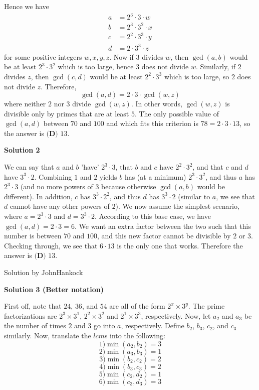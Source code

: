 \begin{enumerate}
 Hence we have
 \begin{align*} a &= 2^3\cdot 3\cdot w\\ b &= 2^3\cdot 3^2\cdot x\\ c &= 2^2\cdot 3^3\cdot y\\ d &= 2\cdot 3^3\cdot z \end{align*}
for some positive integers $w,x,y,z$. Now if $3$ divides $w$, then $\gcd(a,b)$ would be at least $2^3\cdot 3^2$ which is too large, hence $3$ does not divide $w$. Similarly, if $2$ divides $z$, then $\gcd(c,d)$ would be at least $2^2\cdot 3^3$ which is too large, so $2$ does not divide $z$. Therefore,
 \[\gcd(a,d)=2\cdot 3\cdot \gcd(w,z)\]where neither $2$ nor $3$ divide $\gcd(w,z)$. In other words, $\gcd(w,z)$ is divisible only by primes that are at least $5$. The only possible value of $\gcd(a,d)$ between $70$ and $100$ and which fits this criterion is $78=2\cdot3\cdot13$, so the answer is $\boxed{\textbf{(D) }13}$.

 



\textbf{Solution 2}

We can say that $a$ and $b$ 'have' $2^3 \cdot 3$, that $b$ and $c$ have $2^2 \cdot 3^2$, and that $c$ and $d$ have $3^3 \cdot 2$. Combining $1$ and $2$ yields $b$ has (at a minimum) $2^3 \cdot 3^2$, and thus $a$ has $2^3 \cdot 3$ (and no more powers of $3$ because otherwise $\gcd(a,b)$ would be different). In addition, $c$ has $3^3 \cdot 2^2$, and thus $d$ has $3^3 \cdot 2$ (similar to $a$, we see that $d$ cannot have any other powers of $2$). We now assume the simplest scenario, where $a = 2^3 \cdot 3$ and $d = 3^3 \cdot 2$. According to this base case, we have $\gcd(a, d) = 2 \cdot 3 = 6$. We want an extra factor between the two such that this number is between $70$ and $100$, and this new factor cannot be divisible by $2$ or $3$. Checking through, we see that $6 \cdot 13$ is the only one that works. Therefore the answer is $\boxed{\textbf{(D) } 13}$.

 Solution by JohnHankock

 



\textbf{Solution 3 (Better notation)}

First off, note that $24$, $36$, and $54$ are all of the form $2^x\times3^y$. The prime factorizations are $2^3\times 3^1$, $2^2\times 3^2$ and $2^1\times 3^3$, respectively. Now, let $a_2$ and $a_3$ be the number of times $2$ and $3$ go into $a$, respectively. Define $b_2$, $b_3$, $c_2$, and $c_3$ similarly. Now, translate the $lcm$s into the following: 
 \[1) \min(a_2,b_2)=3\] 
 \[2) \min(a_3,b_3)=1\] 
 \[3) \min(b_2,c_2)=2\] 
 \[4) \min(b_3,c_3)=2\] 
 \[5) \min(c_2,d_2)=1\] 
 \[6) \min(c_3,d_3)=3\]


\end{enumerate}
